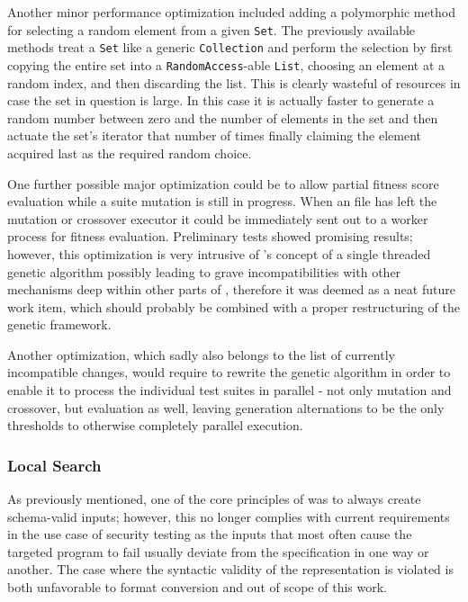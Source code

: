 Another minor performance optimization included adding a polymorphic method for selecting a random 
element from a given \texttt{Set}. The previously available methods treat a \texttt{Set} like a 
generic \texttt{Collection} and perform the selection by first copying the entire set into a 
\texttt{RandomAccess}-able \texttt{List}, choosing an element at a random index, and then discarding the list.
This is clearly wasteful of resources in case the set in question is large. In this case it is actually faster
to generate a random number between zero and the number of elements in the set and then actuate the set's
iterator that number of times finally claiming the element acquired last as the required random choice.

One further possible major optimization could be to allow partial fitness score evaluation while a suite 
mutation is still in progress. When an \xml file has left the mutation or crossover executor it could be 
immediately sent out to a worker process for fitness evaluation. Preliminary tests showed promising 
results; however, this optimization is very intrusive of \evosuite's concept of a single threaded 
genetic algorithm possibly leading to grave incompatibilities with other mechanisms deep within other parts 
of \evosuite, therefore it was deemed as a neat future work item, which should probably be combined with a 
proper restructuring of the genetic framework.

Another optimization, which sadly also belongs to the list of currently incompatible changes, would require to
rewrite the genetic algorithm in order to enable it to process the individual test suites in parallel -
not only mutation and crossover, but evaluation as well, leaving generation alternations to be the only
thresholds to otherwise completely parallel execution.
\subsubsection{Local Search}
\label{sec:local}
As previously mentioned, one of the core principles of \xmlmate was to always create schema-valid inputs; 
however, this no longer complies with current requirements in the use case of security testing as the 
inputs that most often cause the targeted program to fail usually deviate from the specification in 
one way or another. The case where the syntactic validity of the \xml representation is violated is 
both unfavorable to format conversion and out of scope of this work.

